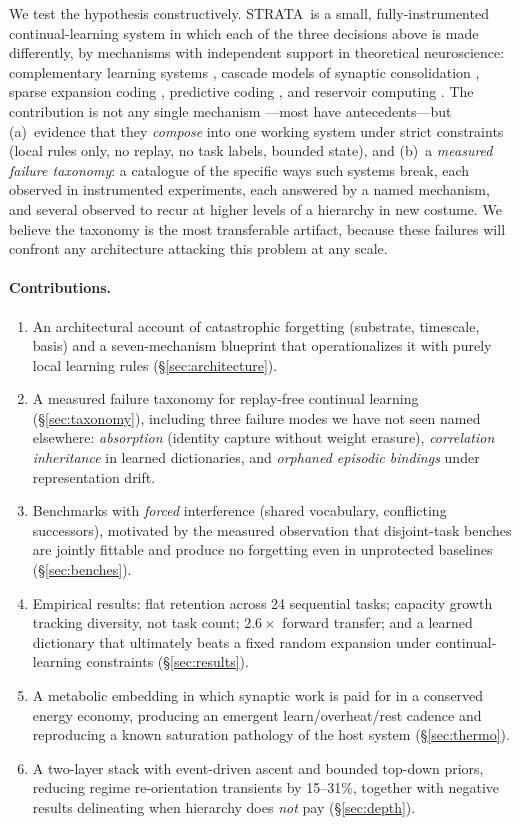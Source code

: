 \documentclass[11pt]{article}
\newcommand{\strata}{STRATA}
\begin{document}
We test the hypothesis constructively. \strata\ is a small,
fully-instrumented continual-learning system in which each of the three
decisions above is made differently, by mechanisms with independent support
in theoretical neuroscience: complementary learning systems
\cite{mcclelland1995}, cascade models of synaptic consolidation
\cite{fusi2005,benna2016}, sparse expansion coding \cite{olshausen1996,
dasgupta2017}, predictive coding \cite{rao1999}, and reservoir computing
\cite{maass2002,jaeger2001}. The contribution is not any single mechanism
---most have antecedents---but (a)~evidence that they \emph{compose} into
one working system under strict constraints (local rules only, no replay,
no task labels, bounded state), and (b)~a \emph{measured failure taxonomy}:
a catalogue of the specific ways such systems break, each observed in
instrumented experiments, each answered by a named mechanism, and several
observed to recur at higher levels of a hierarchy in new costume. We
believe the taxonomy is the most transferable artifact, because these
failures will confront any architecture attacking this problem at any
scale.

\paragraph{Contributions.}
\begin{enumerate}
\item An architectural account of catastrophic forgetting (substrate,
timescale, basis) and a seven-mechanism blueprint that operationalizes it
with purely local learning rules (\S\ref{sec:architecture}).
\item A measured failure taxonomy for replay-free continual learning
(\S\ref{sec:taxonomy}), including three failure modes we have not seen
named elsewhere: \emph{absorption} (identity capture without weight
erasure), \emph{correlation inheritance} in learned dictionaries, and
\emph{orphaned episodic bindings} under representation drift.
\item Benchmarks with \emph{forced} interference (shared vocabulary,
conflicting successors), motivated by the measured observation that
disjoint-task benches are jointly fittable and produce no forgetting even
in unprotected baselines (\S\ref{sec:benches}).
\item Empirical results: flat retention across 24 sequential tasks;
capacity growth tracking diversity, not task count; $2.6\times$ forward
transfer; and a learned dictionary that ultimately beats a fixed random
expansion under continual-learning constraints (\S\ref{sec:results}).
\item A metabolic embedding in which synaptic work is paid for in a
conserved energy economy, producing an emergent learn/overheat/rest cadence
and reproducing a known saturation pathology of the host system
(\S\ref{sec:thermo}).
\item A two-layer stack with event-driven ascent and bounded top-down
priors, reducing regime re-orientation transients by 15--31\%, together
with negative results delineating when hierarchy does \emph{not} pay
(\S\ref{sec:depth}).
\end{enumerate}
\end{document}

